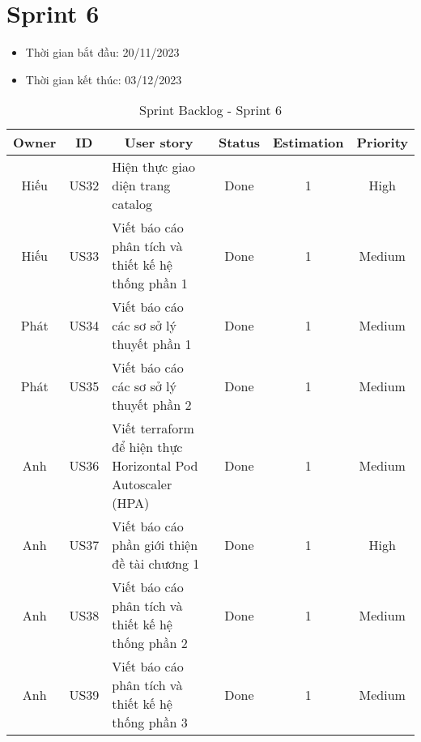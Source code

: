 \section{Sprint 6}
\begin{itemize}
    \item Thời gian bắt đầu: 20/11/2023
    \item Thời gian kết thúc: 03/12/2023
\end{itemize}
\begin{table}[H]
    \begin{tabular}{|c|c|m{6cm}|c|c|c|}
    \hline
    \textbf{Owner} & \textbf{ID} & \multicolumn{1}{c|}{\textbf{User story}}                                & \textbf{Status} & \textbf{Estimation} & \textbf{Priority} \\ \hline
    Hiếu         & US32        & Hiện thực giao diện trang catalog                    & Done            & 1                   & High           \\ \hline
    Hiếu         & US33        & Viết báo cáo phân tích và thiết kế hệ thống phần 1                     & Done            & 1                   & Medium          \\ \hline
    Phát         & US34        & Viết báo cáo các sơ sở lý thuyết phần 1                      & Done            & 1                   & Medium          \\ \hline
    Phát          & US35        & Viết báo cáo các sơ sở lý thuyết phần 2                     & Done            & 1                   & Medium          \\ \hline
    Anh          & US36        & Viết terraform để hiện thực Horizontal Pod Autoscaler (HPA)                     & Done            & 1                   & Medium          \\ \hline
    Anh          & US37        & Viết báo cáo phần giới thiện đề tài chương 1                    & Done            & 1                   & High         \\ \hline
    Anh          & US38        & Viết báo cáo phân tích và thiết kế hệ thống phần 2                     & Done            & 1                   & Medium          \\ \hline
    Anh          & US39        & Viết báo cáo phân tích và thiết kế hệ thống phần 3                    & Done            & 1                   & Medium          \\ \hline
    \end{tabular}
    \caption{Sprint Backlog - Sprint 6}
    \label{tab:sprint-6}
\end{table}

